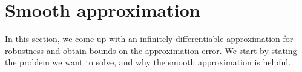 \section{Smooth approximation}
\label{sec:smooth apx}
\newcommand{\fe}{f_\varepsilon}

In this section, we come up with an infinitely differentiable approximation for robustness and obtain bounds on the approximation error. We start by stating the problem we want to solve, and why the smooth approximation is helpful.






